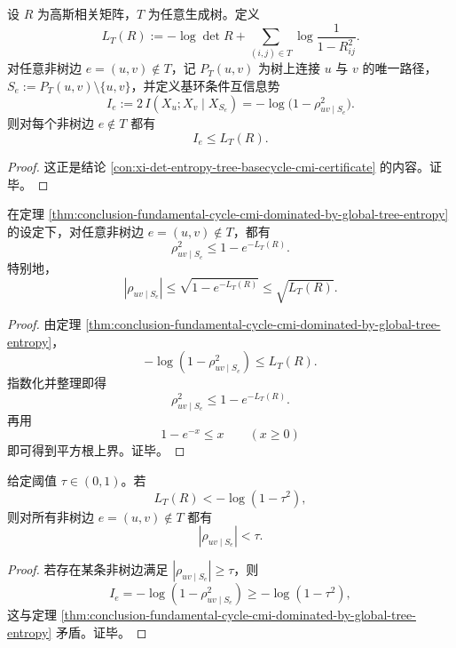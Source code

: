 \begin{theorem}[基环条件互信息的全局体积熵支配]\label{thm:conclusion-fundamental-cycle-cmi-dominated-by-global-tree-entropy}
设 \(R\) 为高斯相关矩阵，\(T\) 为任意生成树。定义
\[
L_T(R):=
-\log\det R+\sum_{(i,j)\in T}\log\frac{1}{1-R_{ij}^2}.
\]
对任意非树边 \(e=(u,v)\notin T\)，记 \(P_T(u,v)\) 为树上连接 \(u\) 与 \(v\) 的唯一路径，\(S_e:=P_T(u,v)\setminus\{u,v\}\)，并定义基环条件互信息势
\[
I_e:=2\,I(X_u;X_v\mid X_{S_e})
=-\log\bigl(1-\rho_{uv\mid S_e}^2\bigr).
\]
则对每个非树边 \(e\notin T\) 都有
\[
I_e\le L_T(R).
\]
\end{theorem}
\begin{proof}
这正是结论 \ref{con:xi-det-entropy-tree-basecycle-cmi-certificate} 的内容。证毕。
\end{proof}

\begin{corollary}[单条遗漏边的条件相关幅度束缚]\label{cor:conclusion-single-omitted-edge-partial-correlation-budget}
在定理 \ref{thm:conclusion-fundamental-cycle-cmi-dominated-by-global-tree-entropy} 的设定下，对任意非树边 \(e=(u,v)\notin T\)，都有
\[
\rho_{uv\mid S_e}^2\le 1-e^{-L_T(R)}.
\]
特别地，
\[
|\rho_{uv\mid S_e}|
\le
\sqrt{1-e^{-L_T(R)}}
\le
\sqrt{L_T(R)}.
\]
\end{corollary}
\begin{proof}
由定理 \ref{thm:conclusion-fundamental-cycle-cmi-dominated-by-global-tree-entropy}，
\[
-\log(1-\rho_{uv\mid S_e}^2)\le L_T(R).
\]
指数化并整理即得
\[
\rho_{uv\mid S_e}^2\le 1-e^{-L_T(R)}.
\]
再用
\[
1-e^{-x}\le x\qquad (x\ge 0)
\]
即可得到平方根上界。证毕。
\end{proof}

\begin{corollary}[树近似的统一阈值证书]\label{cor:conclusion-tree-approximation-uniform-threshold-certificate}
给定阈值 \(\tau\in(0,1)\)。若
\[
L_T(R)<-\log(1-\tau^2),
\]
则对所有非树边 \(e=(u,v)\notin T\) 都有
\[
|\rho_{uv\mid S_e}|<\tau.
\]
\end{corollary}
\begin{proof}
若存在某条非树边满足 \(|\rho_{uv\mid S_e}|\ge \tau\)，则
\[
I_e=-\log(1-\rho_{uv\mid S_e}^2)\ge -\log(1-\tau^2),
\]
这与定理 \ref{thm:conclusion-fundamental-cycle-cmi-dominated-by-global-tree-entropy} 矛盾。证毕。
\end{proof}

